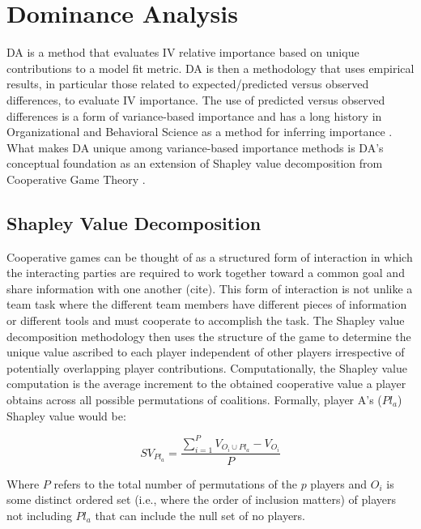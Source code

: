 \documentclass[ShortAfour,times,sageapa]{sagej}
\begin{document}
\section{Dominance Analysis}

	DA is a method that evaluates IV relative importance based on unique contributions to a model fit metric.
	DA is then a methodology that uses empirical results, in particular those related to expected/predicted versus observed differences, to evaluate IV importance.
	The use of predicted versus observed differences is a form of variance-based importance and has a long history in Organizational and Behavioral Science as a method for inferring importance \cite[see]{johnson2004history}.
	What makes DA unique among variance-based importance methods is DA's conceptual foundation as an extension of Shapley value decomposition from Cooperative Game Theory %
	\cite{}.
	
	\subsection{Shapley Value Decomposition}
	
	Cooperative games can be thought of as a structured form of interaction in which the interacting parties are required to work together toward a common goal and share information with one another (cite).
	This form of interaction is not unlike a team task where the different team members have different pieces of information or different tools and must cooperate to accomplish the task.
	The Shapley value decomposition methodology then uses the structure of the game to determine the unique value ascribed to each player independent of other players irrespective of potentially overlapping player contributions.
	Computationally, the Shapley value computation is the average increment to the obtained cooperative value a player obtains across all possible permutations of coalitions. 
	Formally, player A's ($Pl_a$) Shapley value would be:
	
	\begin{equation}
		SV_{Pl_a} = \frac{\sum_{i=1}^{P} V_{O_i \cup Pl_a} - V_{O_i}}{P}
	\end{equation}

	Where $P$ refers to the total number of permutations of the $p$ players and $O_i$ is some distinct ordered set (i.e., where the order of inclusion matters) of players not including $Pl_a$ that can include the null set of no players.
	
\end{document}
